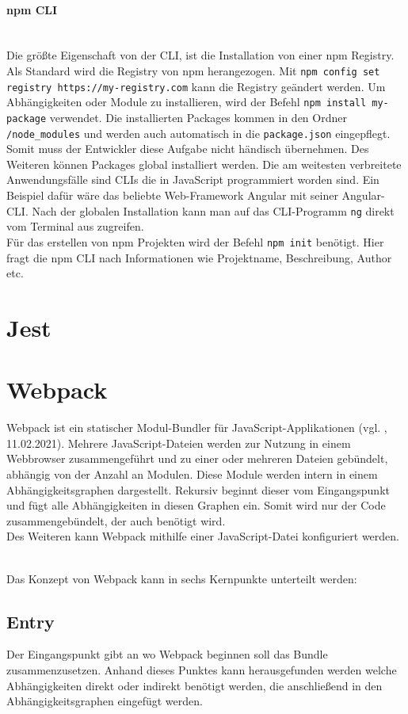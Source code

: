 \paragraph{npm CLI}
\mbox{}\\
Die größte Eigenschaft von der CLI, ist die Installation von einer npm Registry. Als Standard wird die Registry von npm herangezogen. Mit \texttt{npm config set registry https://my-registry.com} kann die Registry geändert werden. Um Abhängigkeiten oder Module zu installieren, wird der Befehl \texttt{npm install my-package} verwendet. Die installierten Packages kommen in den Ordner \texttt{/node\_modules} und werden auch automatisch in die \texttt{package.json} eingepflegt. Somit muss der Entwickler diese Aufgabe nicht händisch übernehmen. Des Weiteren können Packages global installiert werden. Die am weitesten verbreitete Anwendungsfälle sind CLIs die in JavaScript programmiert worden sind. Ein Beispiel dafür wäre das beliebte Web-Framework Angular mit seiner Angular-CLI. Nach der globalen Installation kann man auf das CLI-Programm \texttt{ng} direkt vom Terminal aus zugreifen.
\\
Für das erstellen von npm Projekten wird der Befehl \texttt{npm init} benötigt. Hier fragt die npm CLI nach Informationen wie Projektname, Beschreibung, Author etc.

\section{Jest}

\section{Webpack}
Webpack ist ein statischer Modul-Bundler für JavaScript-Applikationen (vgl. \cite{webpack_2021}, 11.02.2021). Mehrere JavaScript-Dateien werden zur Nutzung in einem Webbrowser zusammengeführt und zu einer oder mehreren Dateien gebündelt, abhängig von der Anzahl an Modulen. Diese Module werden intern in einem Abhängigkeitsgraphen dargestellt. Rekursiv beginnt dieser vom Eingangspunkt und fügt alle Abhängigkeiten in diesen Graphen ein. Somit wird nur der Code zusammengebündelt, der auch benötigt wird. \\
Des Weiteren kann Webpack mithilfe einer JavaScript-Datei konfiguriert werden.

\mbox{}\\
Das Konzept von Webpack kann in sechs Kernpunkte unterteilt werden:

\subsection{Entry}
Der Eingangspunkt gibt an wo Webpack beginnen soll das Bundle zusammenzusetzen. Anhand dieses Punktes kann herausgefunden werden welche Abhängigkeiten direkt oder indirekt benötigt werden, die anschließend in den Abhängigkeitsgraphen eingefügt werden. 

